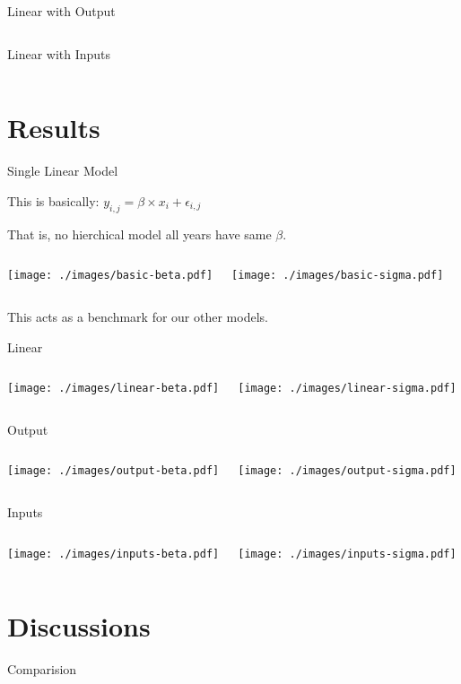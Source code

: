 \documentclass{beamer}
\begin{document}
\begin{frame}[containsverbatim]{Linear with Output}

  \inputminted{jags}{output.jags}
\end{frame}


\begin{frame}[containsverbatim]{Linear with Inputs}
  \inputminted{jags}{inputs.jags}
\end{frame}

\section{Results}

\begin{frame}{Single Linear Model}

  This is basically: $y_{i,j} = \beta \times x_{i} + \epsilon_{i,j}$

  That is, no hierchical model all years have same \(\beta\).
  
  \begin{columns}
    \texttt{[image: ./images/basic-beta.pdf]}
    \pause
    
    \texttt{[image: ./images/basic-sigma.pdf]}
  \end{columns}

  This acts as a benchmark for our other models.
\end{frame}

\begin{frame}{Linear}
  \begin{columns}
    \texttt{[image: ./images/linear-beta.pdf]}
    \pause
    
    \texttt{[image: ./images/linear-sigma.pdf]}
  \end{columns}
\end{frame}


\begin{frame}{Output}
  \begin{columns}
    \texttt{[image: ./images/output-beta.pdf]}
    \pause
    
    \texttt{[image: ./images/output-sigma.pdf]}
  \end{columns}
\end{frame}


\begin{frame}{Inputs}
  \begin{columns}
    \texttt{[image: ./images/inputs-beta.pdf]}
    \pause
    
    \texttt{[image: ./images/inputs-sigma.pdf]}
  \end{columns}
\end{frame}

\section{Discussions}

\begin{frame}{Comparision}

\end{frame}
\end{document}
